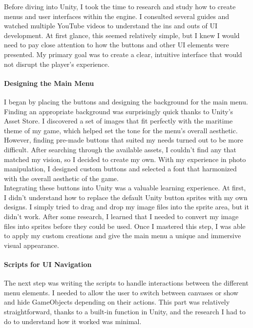 \documentclass{article}
\begin{document}
Before diving into Unity, I took the time to research and study how to create menus and user interfaces within the engine. I consulted several guides and watched multiple YouTube videos to understand the ins and outs of UI development. At first glance, this seemed relatively simple, but I knew I would need to pay close attention to how the buttons and other UI elements were presented. My primary goal was to create a clear, intuitive interface that would not disrupt the player’s experience.

\paragraph{Designing the Main Menu}\hfill

I began by placing the buttons and designing the background for the main menu. Finding an appropriate background was surprisingly quick thanks to Unity’s Asset Store. I discovered a set of images that fit perfectly with the maritime theme of my game, which helped set the tone for the menu's overall aesthetic.\\

However, finding pre-made buttons that suited my needs turned out to be more difficult. After searching through the available assets, I couldn’t find any that matched my vision, so I decided to create my own. With my experience in photo manipulation, I designed custom buttons and selected a font that harmonized with the overall aesthetic of the game.\\

Integrating these buttons into Unity was a valuable learning experience. At first, I didn’t understand how to replace the default Unity button sprites with my own designs. I simply tried to drag and drop my image files into the sprite area, but it didn’t work. After some research, I learned that I needed to convert my image files into sprites before they could be used. Once I mastered this step, I was able to apply my custom creations and give the main menu a unique and immersive visual appearance.

\paragraph{Scripts for UI Navigation}\hfill

The next step was writing the scripts to handle interactions between the different menu elements. I needed to allow the user to switch between canvases or show and hide GameObjects depending on their actions. This part was relatively straightforward, thanks to a built-in function in Unity, and the research I had to do to understand how it worked was minimal.
\end{document}
